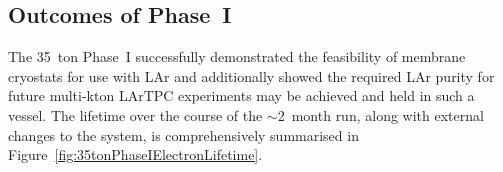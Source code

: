 \subsection{Outcomes of Phase~I}\label{sec:35tonPhaseIOutcomes}

The 35~ton Phase~I successfully demonstrated the feasibility of membrane cryostats for use with LAr and additionally showed the required LAr purity for future multi-kton LArTPC experiments may be achieved and held in such a vessel.  The lifetime over the course of the $\sim2$~month run, along with external changes to the system, is comprehensively summarised in Figure~\ref{fig:35tonPhaseIElectronLifetime}.

